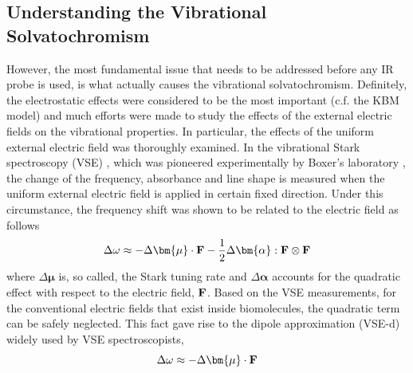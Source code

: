 \documentclass[a4paper,titlepage,twoside,fleqn,12pt]{book}
\newcommand{\BM}[1]{\bm{#1}}
\begin{document}
\begin{refsection}
\section{Understanding the Vibrational Solvatochromism}
%
However, the most fundamental issue that needs to be addressed 
before any IR probe is used, is what actually causes the vibrational solvatochromism.
Definitely, the electrostatic effects were considered to be the most important
(c.f. the KBM model) and much efforts were made to study the effects of the external
electric fields on the vibrational properties. \citep{Kim.Cho.ChemRev.2013} 
In particular, the effects of the
uniform external electric field was thoroughly examined. \citep{Hush.Reimers.JPC.1995,
Reimers.Zeng.Hush.JPC.1996,Andrews.Boxer.JPCA.2002,Cho.JCP.2009} 
In the vibrational Stark spectroscopy (VSE) \citep{Hush.Reimers.JPC.1995,Reimers.Zeng.Hush.JPC.1996}, 
which was pioneered experimentally by Boxer's laboratory \citep{Bublitz.Boxer.AnnuRevPhysChem.1997}, 
the change of the frequency, absorbance
and line shape is measured when the uniform external electric field is applied in certain fixed direction.
Under this circumstance, the frequency shift
was shown to be related to the electric field as follows \citep{Hush.Reimers.JPC.1995,Reimers.Zeng.Hush.JPC.1996}
%
\begin{equation} \label{e:vse-shift-full}
 \Delta \omega \approx - \Delta {\BM \mu} \cdot {\bf F} - \frac{1}{2} \Delta {\BM \alpha} : {\bf F} \otimes {\bf F}
\end{equation}
%
where $\Delta {\BM \mu}$ is, so called, the Stark tuning rate
and $\Delta {\BM \alpha}$ accounts for the quadratic effect with respect to 
the electric field, ${\bf F}$. 
Based on the VSE measurements, for the conventional
electric fields that exist inside biomolecules, the quadratic term
can be safely neglected. 
This fact gave rise to the dipole approximation (VSE-d)
widely used by VSE spectroscopists,
%
\begin{equation} \label{e:vse-shift-dipole}
 \Delta \omega \approx - \Delta {\BM \mu} \cdot {\bf F}

\end{equation}
\end{refsection}
\end{document}
